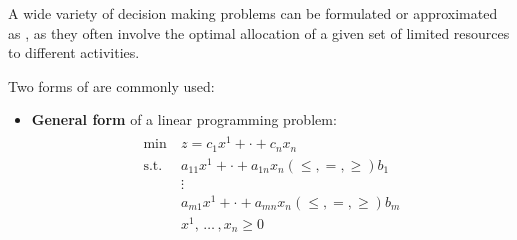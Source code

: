 \documentclass[english]{article}
\begin{document}
\bigskip
A wide variety of decision making problems can be formulated or approximated as \LP, as they often involve the optimal allocation of a given set of limited resources to different activities.

\bigskip
Two forms of \LP are commonly used:

\begin{itemize}
  \item \textbf{General form} of a linear programming problem:
        \begin{gather*}
          \begin{aligned}
            \min \         & z = c_1 x^1 + \cdot + c_n x_n                                    \\
            \text{s.t.} \  & a_{11} x^1 + \cdot + a_{1n} x_n \left( \leq, =, \geq \right) b_1 \\
                           & \vdots                                                           \\
                           & a_{m1} x^1 + \cdot + a_{mn} x_n \left( \leq, =, \geq \right) b_m \\
                           & x^1, \, \ldots \,, x_n \geq 0
          \end{aligned}
        \end{gather*}


\end{itemize}
\end{document}
